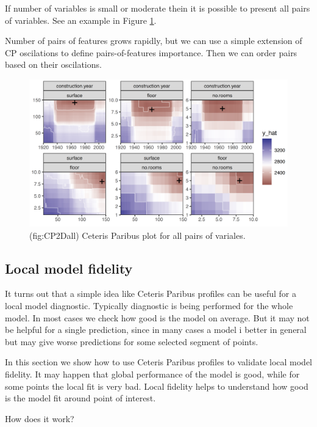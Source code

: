 \documentclass[]{krantz}
\theoremstyle{definition}
\theoremstyle{definition}
\theoremstyle{definition}
\theoremstyle{remark}
\begin{document}
If number of variables is small or moderate thein it is possible to
present all pairs of variables. See an example in Figure
\ref{fig:CP2Dall}.

Number of pairs of features grows rapidly, but we can use a simple
extension of CP oscilations to define pairs-of-features importance. Then
we can order pairs based on their oscilations.

\begin{figure}

{\centering \includegraphics[width=0.9\linewidth]{figure/cp_2d_all} 

}

\caption{(fig:CP2Dall) Ceteris Paribus plot for all pairs of variales.}\label{fig:CP2Dall}
\end{figure}

\hypertarget{local-model-fidelity}{%
\subsection{Local model fidelity}\label{local-model-fidelity}}

It turns out that a simple idea like Ceteris Paribus profiles can be
useful for a local model diagnostic. Typically diagnostic is being
performed for the whole model. In most cases we check how good is the
model on average. But it may not be helpful for a single prediction,
since in many cases a model i better in general but may give worse
predictions for some selected segment of points.

In this section we show how to use Ceteris Paribus profiles to validate
local model fidelity. It may happen that global performance of the model
is good, while for some points the local fit is very bad. Local fidelity
helps to understand how good is the model fit around point of interest.

How does it work?
\end{document}
